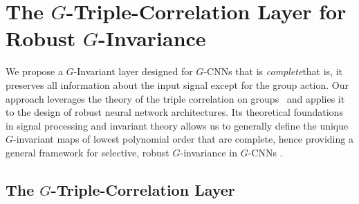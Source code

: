 \section{The $G$-Triple-Correlation Layer for Robust $G$-Invariance}\label{sec:g-tc}

We propose a $G$-Invariant layer designed for $G$-CNNs that is \textit{complete}\textemdash that is, it preserves all information about the input signal except for the group action. Our approach leverages the theory of the triple correlation on groups~\cite{kakarala1992triple} and applies it to the design of robust neural network architectures. Its theoretical foundations in signal processing and invariant theory allows us to generally define the unique $G$-invariant maps of lowest polynomial order that are complete, hence providing a general framework for selective, robust $G$-invariance in $G$-CNNs \cite{sturmfels2008algorithms}.


\subsection{The $G$-Triple-Correlation Layer}



